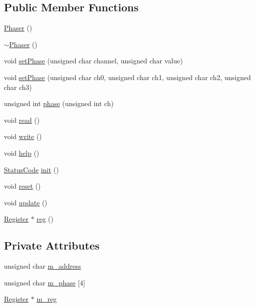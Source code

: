 \subsection*{Public Member Functions}
\begin{DoxyCompactItemize}
\item 
\hyperlink{classPhaser_a849a7f7cd7d1491c490e4ba8e9906af0}{Phaser} ()
\item 
\hyperlink{classPhaser_a1facd3a2776130beb38792025fd8be20}{$\sim$\+Phaser} ()
\item 
void \hyperlink{classPhaser_a35c0add55885b3c0a7551ff48e322632}{set\+Phase} (unsigned char channel, unsigned char value)
\item 
void \hyperlink{classPhaser_a658be408ea31d55067e283723fa144f1}{set\+Phase} (unsigned char ch0, unsigned char ch1, unsigned char ch2, unsigned char ch3)
\item 
unsigned int \hyperlink{classPhaser_a3928ba4f1421c83b2f7783da87727ff2}{phase} (unsigned int ch)
\item 
void \hyperlink{classPhaser_a6ce0713403e961495192ffa0590c29e4}{read} ()
\item 
void \hyperlink{classPhaser_a7a94d4129a5f743c482fa97f3c5df68f}{write} ()
\item 
void \hyperlink{classPhaser_a0f122559297d076500420a7ceb21d70d}{help} ()
\item 
\hyperlink{classStatusCode}{Status\+Code} \hyperlink{classPhaser_a4691b8963a099f8a75475eb9be47a309}{init} ()
\item 
void \hyperlink{classPhaser_a0d15908b0d50f60f4ce6c6d013f75611}{reset} ()
\item 
void \hyperlink{classPhaser_ae1d1d3be2eed3973d269eab78834c594}{update} ()
\item 
\hyperlink{classRegister}{Register} $\ast$ \hyperlink{classPhaser_a3a4b64dc36e5f74292d9bec55da077a7}{reg} ()
\end{DoxyCompactItemize}
\subsection*{Private Attributes}
\begin{DoxyCompactItemize}
\item 
unsigned char \hyperlink{classPhaser_a8395e4279ce87dc816e02dd684a9fa3a}{m\+\_\+address}
\item 
unsigned char \hyperlink{classPhaser_a04df9ce4afe7a36ccaba5e5e727d504e}{m\+\_\+phase} \mbox{[}4\mbox{]}
\item 
\hyperlink{classRegister}{Register} $\ast$ \hyperlink{classPhaser_ab6d751d77cb1e39723a6ac85d4cfec0c}{m\+\_\+reg}
\end{DoxyCompactItemize}
